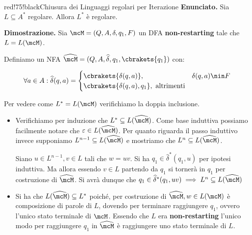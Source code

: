 \begin{halfframedbox}{red!75!black}{Chiusura dei Linguaggi regolari per Iterazione}\label{Regolarità dell'iterazione}
  \textbf{Enunciato. } Sia \(L \subseteq A^*\) regolare. Allora \(L^*\) è regolare.

  \begin{center}
    \textcolor{red!75!black}{\hdashrule[0.5ex]{18cm}{1pt}{3mm 3pt 1mm 2pt}}
  \end{center}

  \textbf{Dimostrazione. } Sia \(\mcM=(Q,A,\delta,q_1,F)\) un DFA \textbf{non-restarting} tale che \(L=L(\mcM)\).

  Definiamo un NFA \(\widehat{\mcM}=(Q, A, \widehat{\delta}, q_1, \cbrakets{q_1})\) con:

  \begin{equation}
      \forall a \in A: \widehat{\delta}(q,a)=\begin{cases}
        \cbrakets{\delta(q,a)}, & \delta(q,a) \nin F\\
        \cbrakets{\delta(q,a), q_1}, \text{ altrimenti}
      \end{cases}
  \end{equation}

  Per vedere come \(L^*=L(\mcM)\) verifichiamo la doppia inclusione.

  \begin{itemize}
    \item [``\(\subseteq\)''] Verifichiamo per induzione che \(L^*\subseteq L(\widehat{\mcM})\). Come base induttiva possiamo facilmente notare che \(\varepsilon \in L(\widehat{\mcM})\).
    Per quanto riguarda il passo induttivo invece supponiamo \(L^{n-1}\subseteq L(\widehat{\mcM})\) e mostriamo che \(L^n \subseteq L(\widehat{\mcM})\).

    Siano \(u \in L^{n-1}, v \in L\) tali che \(w=uv\). Si ha \(q_1 \in \widehat{\delta}^*(q_1,u)\) per ipotesi induttiva. Ma allora essendo \(v \in L\) partendo da \(q_1\) si tornerà in \(q_1\) per costruzione di \(\widehat{\mcM}\). Si avrà dunque che \(q_1 \in \widehat{\delta}^*(q_1,uv) \implies L^n \subseteq L(\widehat{\mcM})\)

    \item [``\(\supseteq\)''] Si ha che \(L(\widehat{\mcM}) \subseteq L^*\) poiché, per costruzione di \(\widehat{\mcM}, w \in L(\mcM)\) è composizione di parole di \(L\), dovendo per terminare raggiungere \(q_1\), ovvero l'unico stato terminale di \(\mcM\). Essendo che \(L\) era \textbf{non-restarting} l'unico modo per raggiungere \(q_1\) in \(\widehat{\mcM}\) è raggiungere uno stato terminale di \(L\).
  \end{itemize}

\end{halfframedbox}

